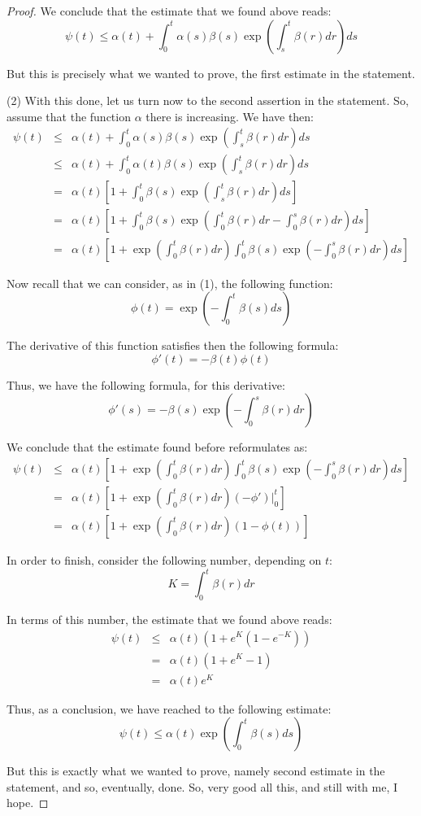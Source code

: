 \documentclass[12pt]{amsbook}
\begin{document}
\begin{proof}
We conclude that the estimate that we found above reads:
$$\psi(t)\leq\alpha(t)+\int_0^t\alpha(s)\beta(s)\exp\left(\int_s^t\beta(r)dr\right)ds$$

But this is precisely what we wanted to prove, the first estimate in the statement.

\medskip

(2) With this done, let us turn now to the second assertion in the statement. So, assume that the function $\alpha$ there is increasing. We have then:
\begin{eqnarray*}
\psi(t)
&\leq&\alpha(t)+\int_0^t\alpha(s)\beta(s)\exp\left(\int_s^t\beta(r)dr\right)ds\\
&\leq&\alpha(t)+\int_0^t\alpha(t)\beta(s)\exp\left(\int_s^t\beta(r)dr\right)ds\\
&=&\alpha(t)\left[1+\int_0^t\beta(s)\exp\left(\int_s^t\beta(r)dr\right)ds\right]\\
&=&\alpha(t)\left[1+\int_0^t\beta(s)\exp\left(\int_0^t\beta(r)dr-\int_0^s\beta(r)dr\right)ds\right]\\
&=&\alpha(t)\left[1+\exp\left(\int_0^t\beta(r)dr\right)\int_0^t\beta(s)\exp\left(-\int_0^s\beta(r)dr\right)ds\right]
\end{eqnarray*}

Now recall that we can consider, as in (1), the following function:
$$\phi(t)=\exp\left(-\int_0^t\beta(s)ds\right)$$

The derivative of this function satisfies then the following formula:
$$\phi'(t)=-\beta(t)\phi(t)$$

Thus, we have the following formula, for this derivative:
$$\phi'(s)=-\beta(s)\exp\left(-\int_0^s\beta(r)dr\right)$$

We conclude that the estimate found before reformulates as:
\begin{eqnarray*}
\psi(t)
&\leq&\alpha(t)\left[1+\exp\left(\int_0^t\beta(r)dr\right)\int_0^t\beta(s)\exp\left(-\int_0^s\beta(r)dr\right)ds\right]\\
&=&\alpha(t)\left[1+\exp\left(\int_0^t\beta(r)dr\right)\left(-\phi'\right)\Big|_0^t\right]\\
&=&\alpha(t)\left[1+\exp\left(\int_0^t\beta(r)dr\right)(1-\phi(t))\right]
\end{eqnarray*}

In order to finish, consider the following number, depending on $t$:
$$K=\int_0^t\beta(r)dr$$

In terms of this number, the estimate that we found above reads:
\begin{eqnarray*}
\psi(t)
&\leq&\alpha(t)(1+e^K(1-e^{-K}))\\
&=&\alpha(t)(1+e^K-1)\\
&=&\alpha(t)e^K
\end{eqnarray*}

Thus, as a conclusion, we have reached to the following estimate:
$$\psi(t)\leq\alpha(t)\exp\left(\int_0^t\beta(s)ds\right)$$

But this is exactly what we wanted to prove, namely second estimate in the statement, and so, eventually, done. So, very good all this, and still with me, I hope. 
\end{proof}
\end{document}
